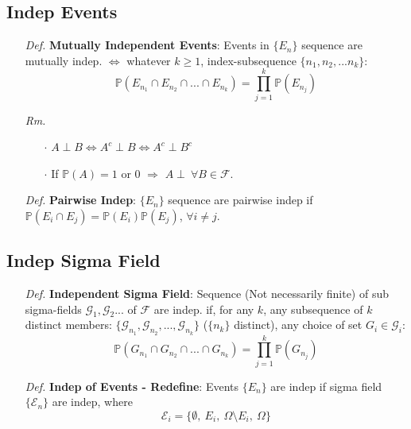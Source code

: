 \documentclass[a4paper,12pt,twoside]{book}
\begin{document}
\subsection{Indep Events}
\begin{itemize}
	\item[\textit{Def.}] \textbf{Mutually Independent Events}: Events in $\{E_n\}$ sequence are mutually indep. $\iff$ whatever $k\geq1$, index-subsequence $\{n_1, n_2, ... n_k\}$: 
	\begin{equation}
		\mathbb{P}(E_{n_1}\cap E_{n_2}\cap ... \cap E_{n_k})=\prod_{j=1}^k \mathbb{P}(E_{n_j})
	\end{equation}

	\item[\textit{Rm.}] 
	\begin{itemize}
		\item[$\cdot$] $A\perp B\iff A^c \perp B \iff A^c\perp B^c$
		\item[$\cdot$] If $\mathbb{P}\left(A\right)=1$ or $0$ $\Rightarrow$ $A\perp~\forall B\in \mathcal{F}$.
	\end{itemize}

	\item[\textit{Def.}] \textbf{Pairwise Indep}: $\{E_n\}$ sequence are pairwise indep if $\mathbb{P}\left(E_i\cap E_j\right)=\mathbb{P}\left(E_i\right)\mathbb{P}\left(E_j\right)$, $\forall i\ne j$.
\end{itemize}

\subsection{Indep Sigma Field}
\begin{itemize}
	\item[\textit{Def.}] \textbf{Independent Sigma Field}: Sequence (Not necessarily finite) of sub sigma-fields $\mathcal{G}_1, \mathcal{G}_2 ... $ of $\mathcal{F}$ are indep. if, for any $k$, any subsequence of $k$ distinct members: $\{\mathcal{G}_{n_1}, \mathcal{G}_{n_2}, ... ,\mathcal{G}_{n_k}\}$ ($\{n_k\}$ distinct), any choice of set ${G}_{i}\in \mathcal{G}_{i}$: 
	\begin{equation}
		\mathbb{P}(G_{n_1}\cap G_{n_2}\cap ... \cap G_{n_k})=\prod_{j=1}^k \mathbb{P}(G_{n_j})
	\end{equation}

	\item[\textit{Def.}] \textbf{Indep of Events - Redefine}: Events $\{E_n\}$ are indep if sigma field $\{\mathcal{E}_n\}$ are indep, where
	\begin{equation}
		\mathcal{E}_i = \{\emptyset,~E_i,~\Omega \setminus E_i,~\Omega\}
	\end{equation}
\end{itemize}
\end{document}
